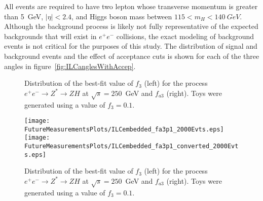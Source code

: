 All events are required to have two lepton whose 
transverse momentum is greater than 5~GeV, $|\eta|<2.4$, and 
Higgs boson mass between $115<m_H<140~GeV$.  Although
the background process is likely not fully representative
of the expected backgrounds that will exist in $e^+e^-$
collisions, the exact modeling of background events is not
critical for the purposes of this study.
The distribution of signal and background events and the effect
of acceptance cuts is shown for each of the three angles in 
figure~\ref{fig:ILCanglesWithAccep}. 

\begin{figure}
\begin{center}
\caption{Distribution of the best-fit value of $f_3$ (left) for
the process $e^+e^-\to Z^*\to ZH$ at $\sqrt{s}=250$~GeV and $f_{a3}$
(right).  Toys were generated using a value of $f_3=0.1$.}
\label{fig:ILCsensitivity}
\end{center}
\end{figure}

\begin{figure}
\begin{center}
\texttt{[image: FutureMeasurementsPlots/ILCembedded\_fa3p1\_2000Evts.eps]}
\texttt{[image: FutureMeasurementsPlots/ILCembedded\_fa3p1\_converted\_2000Evts.eps]}
\caption{Distribution of the best-fit value of $f_3$ (left) for
the process $e^+e^-\to Z^*\to ZH$ at $\sqrt{s}=250$~GeV and $f_{a3}$
(right).  Toys were generated using a value of $f_3=0.1$.}
\label{fig:ILCsensitivity}
\end{center}
\end{figure}

